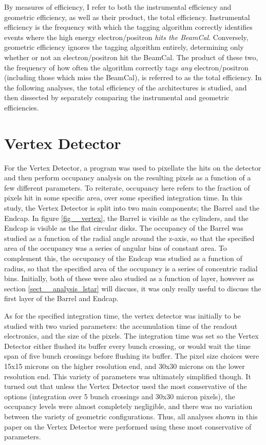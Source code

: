 \documentclass{report}
\begin{document}
            By measures of efficiency, I refer to both the instrumental efficiency and geometric efficiency, as well as their product, the total efficiency. Instrumental efficiency is the frequency with which the tagging algorithm correctly identifies events where the high energy electron/positron \textit{hits the BeamCal}. Conversely, geometric efficiency ignores the tagging algorithm entirely, determining only whether or not an electron/positron hit the BeamCal. The product of these two, the frequency of how often the algorithm correctly tags \textit{any} electron/positron (including those which miss the BeamCal), is referred to as the total efficiency. In the following analyses, the total efficiency of the architectures is studied, and then dissected by separately comparing the instrumental and geometric efficiencies.


        \section{Vertex Detector} \label{sect__analysis_vertex}
            For the Vertex Detector, a program was used to pixellate the hits on the detector and then perform occupancy analysis on the resulting pixels as a function of a few different parameters. To reiterate, occupancy here refers to the fraction of pixels hit in some specific area, over some specified integration time. In this study, the Vertex Detector is split into two main components; the Barrel and the Endcap. In figure \ref{fig__vertex}, the Barrel is visible as the cylinders, and the Endcap is visible as the flat circular disks. The occupancy of the Barrel was studied as a function of the radial angle around the z-axis, so that the specified area of the occupancy was a series of angular bins of constant area. To complement this, the occupancy of the Endcap was studied as a function of radius, so that the specified area of the occupancy is a series of concentric radial bins. Initially, both of these were also studied as a function of layer, however as section \ref{sect__analysis_lstar} will discuss, it was only really useful to discuss the first layer of the Barrel and Endcap.

            As for the specified integration time, the vertex detector was initially to be studied with two varied parameters: the accumulation time of the readout electronics, and the size of the pixels. The integration time was set so the Vertex Detector either flushed its buffer every bunch crossing, or would wait the time span of five bunch crossings before flushing its buffer. The pixel size choices were 15x15 microns on the higher resolution end, and 30x30 microns on the lower resolution end. This variety of parameters was ultimately simplified though. It turned out that unless the Vertex Detector used the most conservative of the options (integration over 5 bunch crossings and 30x30 micron pixels), the occupancy levels were almost completely negligible, and there was no variation between the variety of geometric configurations. Thus, all analyses shown in this paper on the Vertex Detector were performed using these most conservative of parameters.
\end{document}
